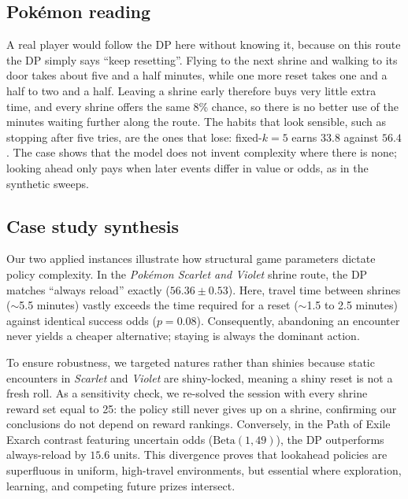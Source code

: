 \documentclass[11pt,a4paper]{article}
\newcommand{\who}[1]{}
\begin{document}
\subsection{Pok\'emon reading\who{Roy}}
A real player would follow the DP here without knowing it, because on this route the DP simply says ``keep resetting''. Flying to the next shrine and walking to its door takes about five and a half minutes, while one more reset takes one and a half to two and a half. Leaving a shrine early therefore buys very little extra time, and every shrine offers the same 8\% chance, so there is no better use of the minutes waiting further along the route. The habits that look sensible, such as stopping after five tries, are the ones that lose: fixed-$k = 5$ earns $33.8$ against $56.4$. The case shows that the model does not invent complexity where there is none; looking ahead only pays when later events differ in value or odds, as in the synthetic sweeps.

\subsection{Case study synthesis}
Our two applied instances illustrate how structural game parameters dictate policy complexity. In the \emph{Pok\'emon Scarlet and Violet} shrine route, the DP matches ``always reload'' exactly ($56.36 \pm 0.53$). Here, travel time between shrines ($\sim$5.5 minutes) vastly exceeds the time required for a reset ($\sim$1.5 to 2.5 minutes) against identical success odds ($p = 0.08$). Consequently, abandoning an encounter never yields a cheaper alternative; staying is always the dominant action. 

To ensure robustness, we targeted natures rather than shinies because static encounters in \emph{Scarlet} and \emph{Violet} are shiny-locked, meaning a shiny reset is not a fresh roll. As a sensitivity check, we re-solved the session with every shrine reward set equal to 25: the policy still never gives up on a shrine, confirming our conclusions do not depend on reward rankings. Conversely, in the Path of Exile Exarch contrast featuring uncertain odds ($\mathrm{Beta}(1,49)$), the DP outperforms always-reload by $15.6$ units. This divergence proves that lookahead policies are superfluous in uniform, high-travel environments, but essential where exploration, learning, and competing future prizes intersect.
\end{document}
